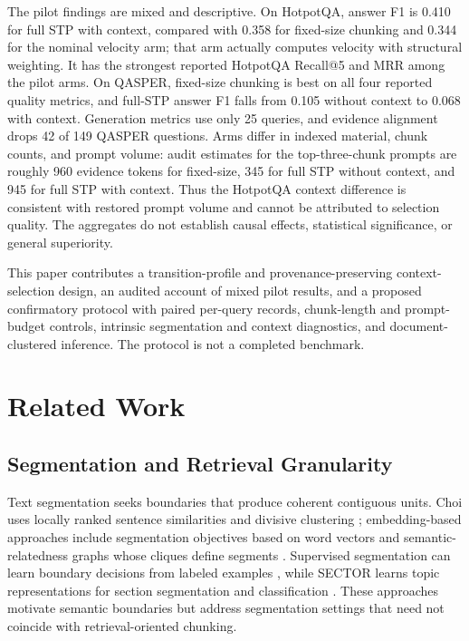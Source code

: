 \documentclass[10pt]{article}
\begin{document}
The pilot findings are mixed and descriptive. On HotpotQA, answer F1 is 0.410 for full STP with context, compared with 0.358 for fixed-size chunking and 0.344 for the nominal velocity arm; that arm actually computes velocity with structural weighting. It has the strongest reported HotpotQA Recall@5 and MRR among the pilot arms. On QASPER, fixed-size chunking is best on all four reported quality metrics, and full-STP answer F1 falls from 0.105 without context to 0.068 with context. Generation metrics use only 25 queries, and evidence alignment drops 42 of 149 QASPER questions. Arms differ in indexed material, chunk counts, and prompt volume: audit estimates for the top-three-chunk prompts are roughly 960 evidence tokens for fixed-size, 345 for full STP without context, and 945 for full STP with context. Thus the HotpotQA context difference is consistent with restored prompt volume and cannot be attributed to selection quality. The aggregates do not establish causal effects, statistical significance, or general superiority.

This paper contributes a transition-profile and provenance-preserving context-selection design, an audited account of mixed pilot results, and a proposed confirmatory protocol with paired per-query records, chunk-length and prompt-budget controls, intrinsic segmentation and context diagnostics, and document-clustered inference. The protocol is not a completed benchmark.

\section{Related Work}

\subsection{Segmentation and Retrieval Granularity}

Text segmentation seeks boundaries that produce coherent contiguous units. Choi uses locally ranked sentence similarities and divisive clustering \cite{Choi2000AdvancesDomain}; embedding-based approaches include segmentation objectives based on word vectors \cite{Alemi2015TextSegmentation} and semantic-relatedness graphs whose cliques define segments \cite{Glavas2016UnsupervisedText}. Supervised segmentation can learn boundary decisions from labeled examples \cite{Koshorek2018TextSegmentation}, while SECTOR learns topic representations for section segmentation and classification \cite{Arnold2019SectorNeural}. These approaches motivate semantic boundaries but address segmentation settings that need not coincide with retrieval-oriented chunking.
\end{document}
